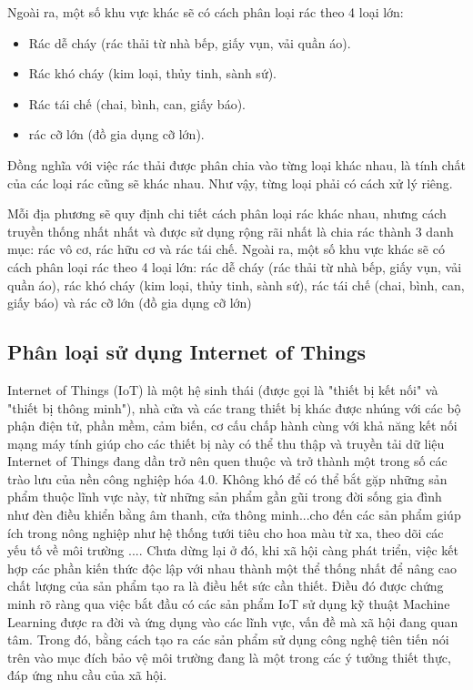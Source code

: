 Ngoài ra, một số khu vực khác sẽ có cách phân loại rác theo 4 loại lớn: 
    \begin{itemize}
        \item Rác dễ cháy (rác thải từ nhà bếp, giấy vụn, vải quần áo).
        \item Rác khó cháy (kim loại, thủy tinh, sành sứ).
        \item Rác tái chế (chai, bình, can, giấy báo).
        \item rác cỡ lớn (đồ gia dụng cỡ lớn).
    \end{itemize}
  

Đồng nghĩa với việc rác thải được phân chia vào từng loại khác nhau, là tính chất của các loại rác cũng sẽ khác nhau. Như vậy, từng loại phải có cách xử lý riêng.

Mỗi địa phương sẽ quy định chi tiết cách phân loại rác khác nhau, nhưng cách truyền thống nhất nhất và được sử dụng rộng rãi nhất là chia rác thành 3 danh mục: rác vô cơ, rác hữu cơ và rác tái chế.
Ngoài ra, một số khu vực khác sẽ có cách phân loại rác theo 4 loại lớn: rác dễ cháy (rác thải từ nhà bếp, giấy vụn, vải quần áo), rác khó cháy (kim loại, thủy tinh, sành sứ), rác tái chế (chai, bình, can, giấy báo) và rác cỡ lớn (đồ gia dụng cỡ lớn)

\subsection{Phân loại sử dụng Internet of Things}
Internet of Things (IoT) là một hệ sinh thái (được gọi là "thiết bị kết nối" và "thiết bị thông minh"), nhà cửa và các trang thiết bị khác được nhúng với các bộ phận điện tử, phần mềm, cảm biến, cơ cấu chấp hành cùng với khả năng kết nối mạng máy tính giúp cho các thiết bị này có thể thu thập và truyền tải dữ liệu
Internet of Things đang dần trở nên quen thuộc và trở thành một trong số các trào lưu của nền công nghiệp hóa 4.0.
Không khó để có thể bắt gặp những sản phẩm thuộc lĩnh vực này, từ những sản phẩm gần gũi trong đời sống gia đình như đèn điều khiển bằng âm thanh, cửa thông minh...cho đến các sản phẩm giúp ích trong nông nghiệp như hệ thống tưới tiêu cho hoa màu từ xa, theo dõi các yếu tố về môi trường .... 
Chưa dừng lại ở đó, khi xã hội càng phát triển, việc kết hợp các phần kiến thức độc lập với nhau thành một thể thống nhất để nâng cao chất lượng của sản phẩm tạo ra là điều hết sức cần thiết.
Điều đó được chứng minh rõ ràng qua việc bắt đầu có các sản phẩm IoT sử dụng kỹ thuật Machine Learning được ra đời và ứng dụng vào các lĩnh vực, vấn đề mà xã hội đang quan tâm.
Trong đó, bằng cách tạo ra các sản phẩm sử dụng công nghệ tiên tiến nói trên vào mục đích bảo vệ môi trường đang là một trong các ý tưởng thiết thực, đáp ứng nhu cầu của xã hội.
 
